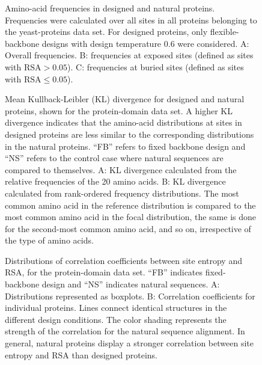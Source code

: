 \documentclass[12pt]{article}
\begin{document}
\begin{figure}[H]
\caption{Amino-acid frequencies in designed and natural proteins. Frequencies were calculated over all sites in all proteins belonging to the yeast-proteins data set. For designed proteins, only flexible-backbone designs with design temperature 0.6 were considered. A: Overall frequencies. B: frequencies at exposed sites (defined as sites with $\text{RSA}>0.05$). C: frequencies at buried sites (defined as sites with $\text{RSA}\leq0.05$).}
\label{AAFreqsYeastProteins}
\end{figure}


\begin{figure}[H]
\caption{Mean Kullback-Leibler (KL) divergence for designed and natural proteins, shown for the protein-domain data set. A higher KL divergence indicates that the amino-acid distributions at sites in designed proteins are less similar to the corresponding distributions in the natural proteins. ``FB'' refers to fixed backbone design and ``NS'' refers to the control case where natural sequences are compared to themselves. A: KL divergence calculated from the relative frequencies of the 20 amino acids. B: KL divergence calculated from rank-ordered frequency distributions. The most common amino acid in the reference distribution is compared to the most common amino acid in the focal distribution, the same is done for the second-most common amino acid, and so on, irrespective of the type of amino acids.}
\label{AADisFig1}
\end{figure}


\begin{figure}[H]
\caption{Distributions of correlation coefficients between site entropy and RSA, for the protein-domain data set. ``FB'' indicates fixed-backbone design and ``NS'' indicates natural sequences. A: Distributions represented as boxplots. B: Correlation coefficients for individual proteins. Lines connect identical structures in the different design conditions. The color shading represents the strength of the correlation for the natural sequence alignment. In general, natural proteins display a stronger correlation between site entropy and RSA than designed proteins.}
\label{Correlation_figure}
\end{figure}
\end{document}
